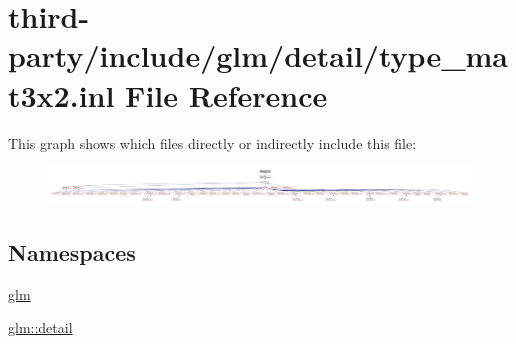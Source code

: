 \hypertarget{type__mat3x2_8inl}{}\section{third-\/party/include/glm/detail/type\+\_\+mat3x2.inl File Reference}
\label{type__mat3x2_8inl}
This graph shows which files directly or indirectly include this file\+:
\nopagebreak
\begin{figure}[H]
\begin{center}
\leavevmode
\includegraphics[width=350pt]{type__mat3x2_8inl__dep__incl}
\end{center}
\end{figure}
\subsection*{Namespaces}
\begin{DoxyCompactItemize}
\item 
 \hyperlink{namespaceglm}{glm}
\item 
 \hyperlink{namespaceglm_1_1detail}{glm\+::detail}
\end{DoxyCompactItemize}
